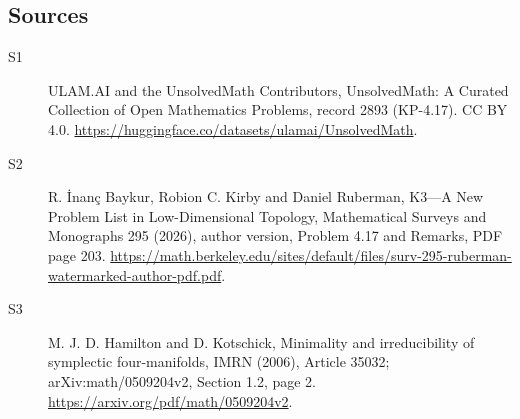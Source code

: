 \documentclass[11pt]{article}
\begin{document}
\subsection{Sources}
\begin{description}
\item[\hypertarget{source:2893:1}{S1}] ULAM.AI and the UnsolvedMath Contributors, UnsolvedMath: A Curated Collection of Open Mathematics Problems, record 2893 (KP-4.17). CC BY 4.0. \url{https://huggingface.co/datasets/ulamai/UnsolvedMath}.
\item[\hypertarget{source:2893:2}{S2}] R. İnanç Baykur, Robion C. Kirby and Daniel Ruberman, K3—A New Problem List in Low-Dimensional Topology, Mathematical Surveys and Monographs 295 (2026), author version, Problem 4.17 and Remarks, PDF page 203. \url{https://math.berkeley.edu/sites/default/files/surv-295-ruberman-watermarked-author-pdf.pdf}.
\item[\hypertarget{source:2893:3}{S3}] M. J. D. Hamilton and D. Kotschick, Minimality and irreducibility of symplectic four-manifolds, IMRN (2006), Article 35032; arXiv:math/0509204v2, Section 1.2, page 2. \url{https://arxiv.org/pdf/math/0509204v2}.
\end{description}
\label{end:2893}
\end{document}
